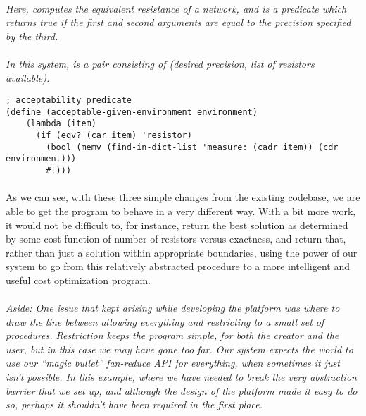 \paragraph{}
\textit{Here,  computes the equivalent resistance of a network, and  is a predicate which returns true if the first and second arguments are equal to the precision specified by the third.}

\paragraph{}
\textit{In this system,  is a pair consisting of (desired precision, list of resistors available).}


\begin{verbatim}
; acceptability predicate
(define (acceptable-given-environment environment)
    (lambda (item)
      (if (eqv? (car item) 'resistor)
        (bool (memv (find-in-dict-list 'measure: (cadr item)) (cdr environment)))
        #t)))
\end{verbatim}

\paragraph{}
As we can see, with these three simple changes from the existing codebase, we are able to get the program to behave in a very different way. With a bit more work, it would not be difficult to, for instance, return the best solution as determined by some cost function of number of resistors versus exactness, and return that, rather than just a solution within appropriate boundaries, using the power of our system to go from this relatively abstracted  procedure to a more intelligent and useful cost optimization program.

\paragraph{}
\textit{Aside: One issue that kept arising while developing the platform was where to draw the line between allowing everything and restricting to a small set of procedures. Restriction keeps the program simple, for both the creator and the user, but in this case we may have gone too far. Our system expects the world to use our ``magic bullet'' fan-reduce API for everything, when sometimes it just isn't possible. In this example, where we have needed to break the very abstraction barrier that we set up, and although the design of the platform made it easy to do so, perhaps it shouldn't have been required in the first place.}

